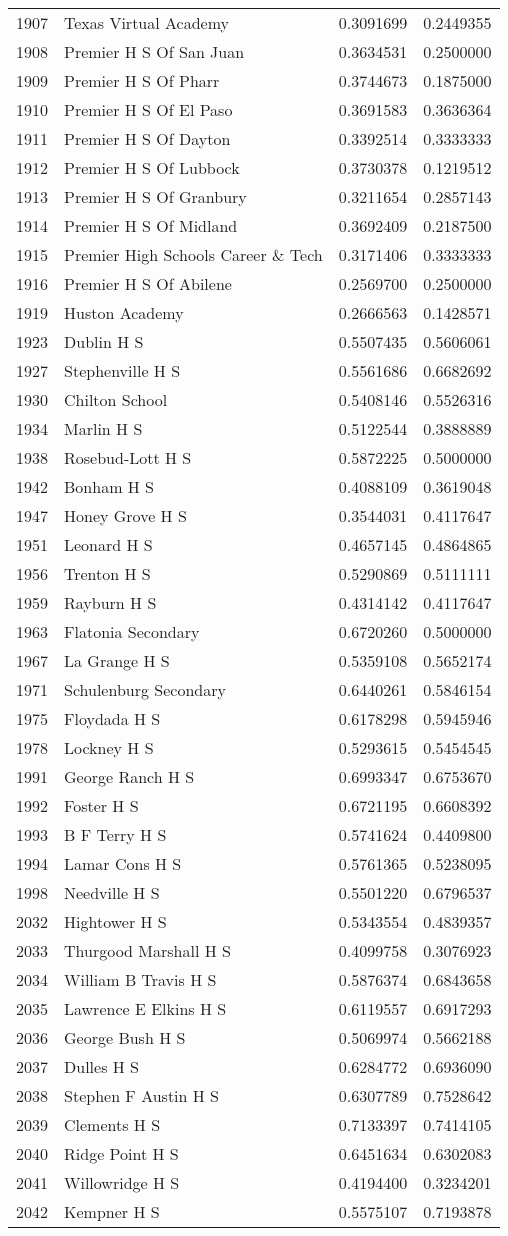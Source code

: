 \documentclass[
]{article}
\begin{document}
\begin{longtable}[]{@{}llrr@{}}
1907 & Texas Virtual Academy & 0.3091699 & 0.2449355\tabularnewline
1908 & Premier H S Of San Juan & 0.3634531 & 0.2500000\tabularnewline
1909 & Premier H S Of Pharr & 0.3744673 & 0.1875000\tabularnewline
1910 & Premier H S Of El Paso & 0.3691583 & 0.3636364\tabularnewline
1911 & Premier H S Of Dayton & 0.3392514 & 0.3333333\tabularnewline
1912 & Premier H S Of Lubbock & 0.3730378 & 0.1219512\tabularnewline
1913 & Premier H S Of Granbury & 0.3211654 & 0.2857143\tabularnewline
1914 & Premier H S Of Midland & 0.3692409 & 0.2187500\tabularnewline
1915 & Premier High Schools Career \& Tech & 0.3171406 &
0.3333333\tabularnewline
1916 & Premier H S Of Abilene & 0.2569700 & 0.2500000\tabularnewline
1919 & Huston Academy & 0.2666563 & 0.1428571\tabularnewline
1923 & Dublin H S & 0.5507435 & 0.5606061\tabularnewline
1927 & Stephenville H S & 0.5561686 & 0.6682692\tabularnewline
1930 & Chilton School & 0.5408146 & 0.5526316\tabularnewline
1934 & Marlin H S & 0.5122544 & 0.3888889\tabularnewline
1938 & Rosebud-Lott H S & 0.5872225 & 0.5000000\tabularnewline
1942 & Bonham H S & 0.4088109 & 0.3619048\tabularnewline
1947 & Honey Grove H S & 0.3544031 & 0.4117647\tabularnewline
1951 & Leonard H S & 0.4657145 & 0.4864865\tabularnewline
1956 & Trenton H S & 0.5290869 & 0.5111111\tabularnewline
1959 & Rayburn H S & 0.4314142 & 0.4117647\tabularnewline
1963 & Flatonia Secondary & 0.6720260 & 0.5000000\tabularnewline
1967 & La Grange H S & 0.5359108 & 0.5652174\tabularnewline
1971 & Schulenburg Secondary & 0.6440261 & 0.5846154\tabularnewline
1975 & Floydada H S & 0.6178298 & 0.5945946\tabularnewline
1978 & Lockney H S & 0.5293615 & 0.5454545\tabularnewline
1991 & George Ranch H S & 0.6993347 & 0.6753670\tabularnewline
1992 & Foster H S & 0.6721195 & 0.6608392\tabularnewline
1993 & B F Terry H S & 0.5741624 & 0.4409800\tabularnewline
1994 & Lamar Cons H S & 0.5761365 & 0.5238095\tabularnewline
1998 & Needville H S & 0.5501220 & 0.6796537\tabularnewline
2032 & Hightower H S & 0.5343554 & 0.4839357\tabularnewline
2033 & Thurgood Marshall H S & 0.4099758 & 0.3076923\tabularnewline
2034 & William B Travis H S & 0.5876374 & 0.6843658\tabularnewline
2035 & Lawrence E Elkins H S & 0.6119557 & 0.6917293\tabularnewline
2036 & George Bush H S & 0.5069974 & 0.5662188\tabularnewline
2037 & Dulles H S & 0.6284772 & 0.6936090\tabularnewline
2038 & Stephen F Austin H S & 0.6307789 & 0.7528642\tabularnewline
2039 & Clements H S & 0.7133397 & 0.7414105\tabularnewline
2040 & Ridge Point H S & 0.6451634 & 0.6302083\tabularnewline
2041 & Willowridge H S & 0.4194400 & 0.3234201\tabularnewline
2042 & Kempner H S & 0.5575107 & 0.7193878\tabularnewline

\end{longtable}
\end{document}
